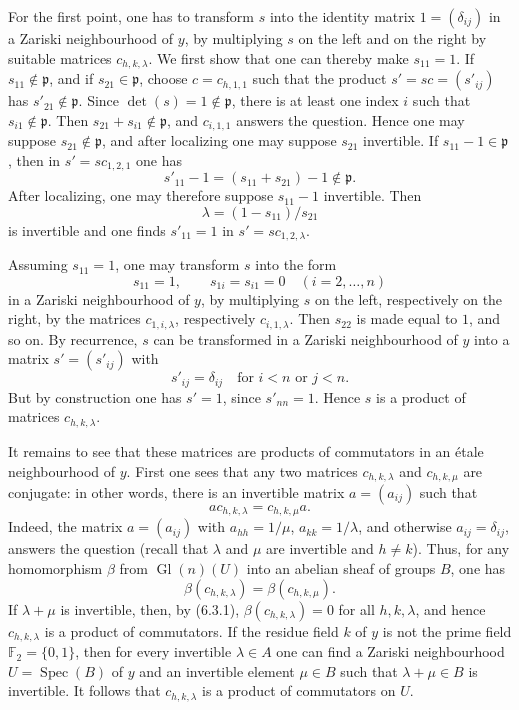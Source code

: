 \documentclass[11pt]{article}
\newcommand{\Spec}{\operatorname{Spec}}
\providecommand{\Gl}{\operatorname{Gl}}
\begin{document}
For the first point, one has to transform \(s\) into the identity matrix \(1=(\delta_{ij})\) in a Zariski neighbourhood of \(y\), by multiplying \(s\) on the left and on the right by suitable matrices \(c_{h,k,\lambda}\). We first show that one can thereby make \(s_{11}=1\). If \(s_{11}\notin\mathfrak p\), and if \(s_{21}\in\mathfrak p\), choose \(c=c_{h,1,1}\) such that the product \(s'=sc=(s'_{ij})\) has \(s'_{21}\notin\mathfrak p\). Since \(\det(s)=1\notin\mathfrak p\), there is at least one index \(i\) such that \(s_{i1}\notin\mathfrak p\). Then \(s_{21}+s_{i1}\notin\mathfrak p\), and \(c_{i,1,1}\) answers the question. Hence one may suppose \(s_{21}\notin\mathfrak p\), and after localizing one may suppose \(s_{21}\) invertible. If \(s_{11}-1\in\mathfrak p\), then in \(s'=sc_{1,2,1}\) one has
\[
 s'_{11}-1=(s_{11}+s_{21})-1\notin\mathfrak p.
\]
After localizing, one may therefore suppose \(s_{11}-1\) invertible. Then
\[
 \lambda=(1-s_{11})/s_{21}
\]
is invertible and one finds \(s'_{11}=1\) in \(s'=sc_{1,2,\lambda}\).

Assuming \(s_{11}=1\), one may transform \(s\) into the form
\[
 s_{11}=1,\qquad s_{1i}=s_{i1}=0\quad (i=2,\ldots,n)
\]
in a Zariski neighbourhood of \(y\), by multiplying \(s\) on the left, respectively on the right, by the matrices \(c_{1,i,\lambda}\), respectively \(c_{i,1,\lambda}\). Then \(s_{22}\) is made equal to \(1\), and so on. By recurrence, \(s\) can be transformed in a Zariski neighbourhood of \(y\) into a matrix \(s'=(s'_{ij})\) with
\[
 s'_{ij}=\delta_{ij}\quad\text{for }i<n\text{ or }j<n.
\]
But by construction one has \(s'=1\), since \(s'_{nn}=1\). Hence \(s\) is a product of matrices \(c_{h,k,\lambda}\).

It remains to see that these matrices are products of commutators in an étale neighbourhood of \(y\). First one sees that any two matrices \(c_{h,k,\lambda}\) and \(c_{h,k,\mu}\) are conjugate: in other words, there is an invertible matrix \(a=(a_{ij})\) such that
\[
 ac_{h,k,\lambda}=c_{h,k,\mu}a.
\]
Indeed, the matrix \(a=(a_{ij})\) with \(a_{hh}=1/\mu\), \(a_{kk}=1/\lambda\), and otherwise \(a_{ij}=\delta_{ij}\), answers the question (recall that \(\lambda\) and \(\mu\) are invertible and \(h\ne k\)). Thus, for any homomorphism \(\beta\) from \(\Gl(n)(U)\) into an abelian sheaf of groups \(B\), one has
\[
 \beta(c_{h,k,\lambda})=\beta(c_{h,k,\mu}).
\]
If \(\lambda+\mu\) is invertible, then, by (6.3.1), \(\beta(c_{h,k,\lambda})=0\) for all \(h,k,\lambda\), and hence \(c_{h,k,\lambda}\) is a product of commutators. If the residue field \(k\) of \(y\) is not the prime field \(\mathbb F_2=\{0,1\}\), then for every invertible \(\lambda\in A\) one can find a Zariski neighbourhood \(U=\Spec(B)\) of \(y\) and an invertible element \(\mu\in B\) such that \(\lambda+\mu\in B\) is invertible. It follows that \(c_{h,k,\lambda}\) is a product of commutators on \(U\).
\end{document}
